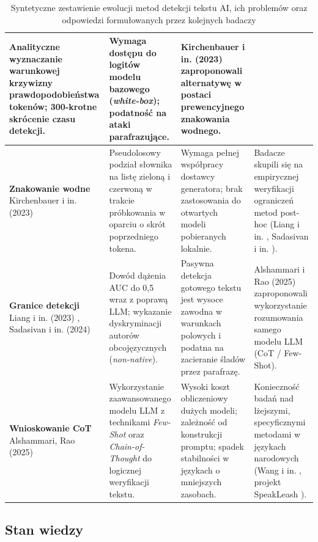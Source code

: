 \begin{table}[H]
\begin{tabularx}{\textwidth}{|p{2.6cm}|X|X|X|}
Analityczne wyznaczanie warunkowej krzywizny prawdopodobieństwa tokenów; 300-krotne skrócenie czasu detekcji. &
Wymaga dostępu do logitów modelu bazowego (\textit{white-box}); podatność na ataki parafrazujące. &
Kirchenbauer i in. (2023) \cite{kirchenbauer2023watermark} zaproponowali alternatywę w postaci prewencyjnego znakowania wodnego. \\
\hline
\textbf{Znakowanie wodne} \newline Kirchenbauer i in. (2023) \cite{kirchenbauer2023watermark} &
Pseudolosowy podział słownika na listę zieloną i czerwoną w trakcie próbkowania w oparciu o skrót poprzedniego tokena. &
Wymaga pełnej współpracy dostawcy generatora; brak zastosowania do otwartych modeli pobieranych lokalnie. &
Badacze skupili się na empirycznej weryfikacji ograniczeń metod post-hoc (Liang i in. \cite{liang2023gptdetectors}, Sadasivan i in. \cite{sadasivan2023can}). \\
\hline
\textbf{Granice detekcji} \newline Liang i in. (2023) \cite{liang2023gptdetectors}, Sadasivan i in. (2024) \cite{sadasivan2023can} &
Dowód dążenia AUC do 0,5 wraz z poprawą LLM; wykazanie dyskryminacji autorów obcojęzycznych (\textit{non-native}). &
Pasywna detekcja gotowego tekstu jest wysoce zawodna w warunkach polowych i podatna na zacieranie śladów przez parafrazę. &
Alshammari i Rao (2025) \cite{alshammari2025evaluating} zaproponowali wykorzystanie rozumowania samego modelu LLM (CoT / Few-Shot). \\
\hline
\textbf{Wnioskowanie CoT} \newline Alshammari, Rao (2025) \cite{alshammari2025evaluating} &
Wykorzystanie zaawansowanego modelu LLM z technikami \textit{Few-Shot} oraz \textit{Chain-of-Thought} do logicznej weryfikacji tekstu. &
Wysoki koszt obliczeniowy dużych modeli; zależność od konstrukcji promptu; spadek stabilności w językach o mniejszych zasobach. &
Konieczność badań nad lżejszymi, specyficznymi metodami w językach narodowych (Wang i in. \cite{wang2023m4}, projekt SpeakLeash \cite{speakleash2024}). \\
\hline
\end{tabularx}
\caption{Syntetyczne zestawienie ewolucji metod detekcji tekstu AI, ich problemów oraz odpowiedzi formułowanych przez kolejnych badaczy}
\label{tab:ewolucja_problemow}
\end{table}



\subsection{Stan wiedzy}

